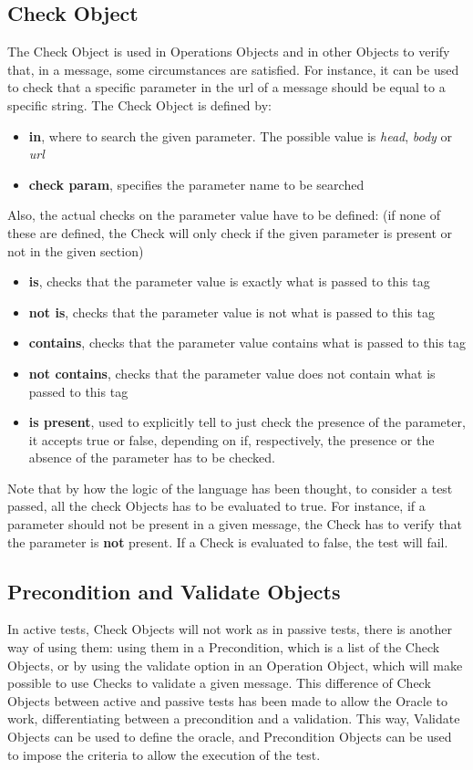 \subsection{Check Object}
The Check Object is used in Operations Objects and in other Objects to verify that, in a message, some circumstances are satisfied. For instance, it can be used to check that a specific parameter in the url of a message should be equal to a specific string.
The Check Object is defined by:
\begin{itemize}
    \item \textbf{in}, where to search the given parameter. The possible value is \textit{head}, \textit{body} or \textit{url}
    \item \textbf{check param}, specifies the parameter name to be searched
\end{itemize}
Also, the actual checks on the parameter value have to be defined: (if none of these are defined, the Check will only check if the given parameter is present or not in the given section)
\begin{itemize}
    \item \textbf{is}, checks that the parameter value is exactly what is passed to this tag
    \item \textbf{not is}, checks that the parameter value is not what is passed to this tag
    \item \textbf{contains}, checks that the parameter value contains what is passed to this tag 
    \item \textbf{not contains}, checks that the parameter value does not contain what is passed to this tag 
    \item \textbf{is present}, used to explicitly tell to just check the presence of the parameter, it accepts true or false, depending on if, respectively, the presence or the absence of the parameter has to be checked.
\end{itemize}

Note that by how the logic of the language has been thought, to consider a test passed, all the check Objects has to be evaluated to true. For instance, if a parameter should not be present in a given message, the Check has to verify that the parameter is \textbf{not} present. If a Check is evaluated to false, the test will fail.

\subsection{Precondition and Validate Objects}
In active tests, Check Objects will not work as in passive tests, there is another way of using them: using them in a Precondition, which is a list of the Check Objects, or by using the validate option in an Operation Object, which will make possible to use Checks to validate a given message. This difference of Check Objects between active and passive tests has been made to allow the Oracle to work, differentiating between a precondition and a validation. This way, Validate Objects can be used to define the oracle, and Precondition Objects can be used to impose the criteria to allow the execution of the test.
